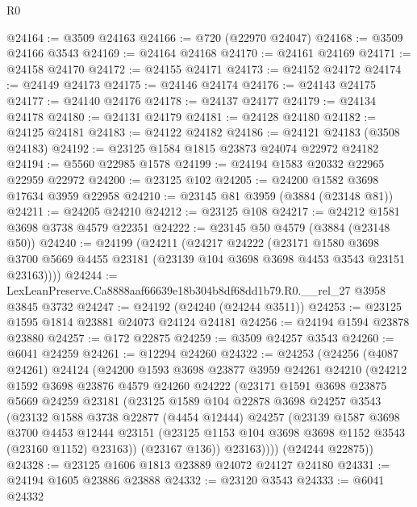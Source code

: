\begin{lexlean}{R0}
\begin{coremodule}
@24164 := @3509 @24163
@24166 := @720 (@22970 @24047)
@24168 := @3509 @24166 @3543
@24169 := @24164 @24168
@24170 := @24161 @24169
@24171 := @24158 @24170
@24172 := @24155 @24171
@24173 := @24152 @24172
@24174 := @24149 @24173
@24175 := @24146 @24174
@24176 := @24143 @24175
@24177 := @24140 @24176
@24178 := @24137 @24177
@24179 := @24134 @24178
@24180 := @24131 @24179
@24181 := @24128 @24180
@24182 := @24125 @24181
@24183 := @24122 @24182
@24186 := @24121 @24183 (@3508 @24183)
@24192 := @23125 @1584 @1815 @23873 @24074 @22972 @24182
@24194 := @5560 @22985 @1578
@24199 := @24194 @1583 @20332 @22965 @22959 @22972
@24200 := @23125 @102
@24205 := @24200 @1582 @3698 @17634 @3959 @22958
@24210 := @23145 @81 @3959 (@3884 (@23148 @81))
@24211 := @24205 @24210
@24212 := @23125 @108
@24217 := @24212 @1581 @3698 @3738 @4579 @22351
@24222 := @23145 @50 @4579 (@3884 (@23148 @50))
@24240 := @24199
    (@24211
      (@24217
        @24222
        (@23171
          @1580
          @3698
          @3700
          @5669
          @4455
          @23181
          (@23139 @104 @3698 @3698 @4453 @3543 @23151 @23163))))
@24244 := LexLeanPreserve.Ca8888aaf66639e18b304b8df68dd1b79.R0.__rel_27 @3958 @3845 @3732
@24247 := @24192 (@24240 (@24244 @3511))
@24253 := @23125 @1595 @1814 @23881 @24073 @24124 @24181
@24256 := @24194 @1594 @23878 @23880
@24257 := @172 @22875
@24259 := @3509 @24257 @3543
@24260 := @6041 @24259
@24261 := @12294 @24260
@24322 := @24253
    (@24256
      (@4087 @24261)
      @24124
      (@24200
        @1593
        @3698
        @23877
        @3959
        @24261
        @24210
        (@24212
          @1592
          @3698
          @23876
          @4579
          @24260
          @24222
          (@23171
            @1591
            @3698
            @23875
            @5669
            @24259
            @23181
            (@23125
              @1589
              @104
              @22878
              @3698
              @24257
              @3543
              (@23132
                @1588
                @3738
                @22877
                (@4454 @12444)
                @24257
                (@23139
                  @1587
                  @3698
                  @3700
                  @4453
                  @12444
                  @23151
                  (@23125 @1153 @104 @3698 @3698 @1152 @3543 (@23160 @1152) @23163))
                (@23167 @136))
              @23163))))
      (@24244 @22875))
@24328 := @23125 @1606 @1813 @23889 @24072 @24127 @24180
@24331 := @24194 @1605 @23886 @23888
@24332 := @23120 @3543
@24333 := @6041 @24332

\end{coremodule}
\end{lexlean}
